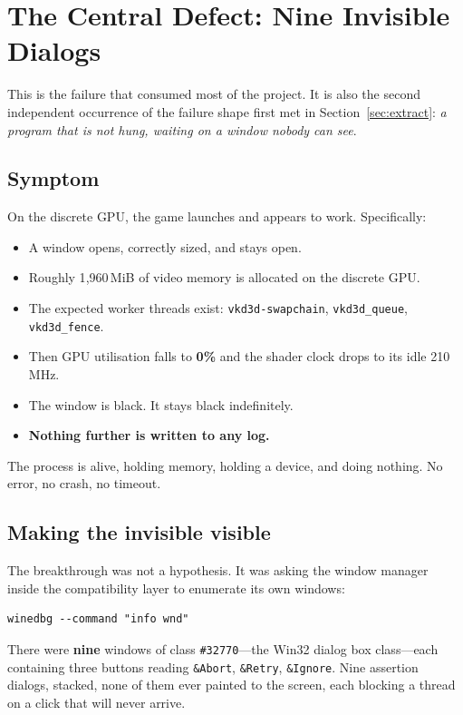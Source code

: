 \section{The Central Defect: Nine Invisible Dialogs}
\label{sec:deadlock}

This is the failure that consumed most of the project. It is also the second
independent occurrence of the failure shape first met in
Section~\ref{sec:extract}: \emph{a program that is not hung, waiting on a window
nobody can see}.

\subsection{Symptom}

On the discrete GPU, the game launches and appears to work. Specifically:

\begin{itemize}
\item A window opens, correctly sized, and stays open.
\item Roughly 1{,}960\,MiB of video memory is allocated on the discrete GPU.
\item The expected worker threads exist: \verb|vkd3d-swapchain|,
      \verb|vkd3d_queue|, \verb|vkd3d_fence|.
\item Then GPU utilisation falls to \textbf{0\%} and the shader clock drops to
      its idle 210\,MHz.
\item The window is black. It stays black indefinitely.
\item \textbf{Nothing further is written to any log.}
\end{itemize}

The process is alive, holding memory, holding a device, and doing nothing. No
error, no crash, no timeout.

\subsection{Making the invisible visible}
\label{sec:harness}

The breakthrough was not a hypothesis. It was asking the window manager inside
the compatibility layer to enumerate its own windows:

\begin{lstlisting}
winedbg --command "info wnd"
\end{lstlisting}

There were \textbf{nine} windows of class \verb|#32770|---the Win32 dialog box
class---each containing three buttons reading \verb|&Abort|, \verb|&Retry|,
\verb|&Ignore|. Nine assertion dialogs, stacked, none of them ever painted to the
screen, each blocking a thread on a click that will never arrive.

